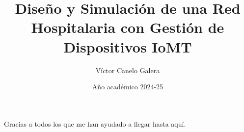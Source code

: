 \documentclass[spanish,GINF]{TFGEPSUIB}
\title{Diseño y Simulación de una Red Hospitalaria con Gestión de Dispositivos IoMT}
\author{Víctor Canelo Galera}
\date{Año académico 2024-25}
\begin{document}
\portada
\portadainterior
\frontmatter

%
\cleartorecto \thispagestyle{empty}
\begin{agraiments}
Gracias a todos los que me han ayudado a llegar hasta aquí.
\end{agraiments}

\cleartorecto \tableofcontents

\cleartorecto \listoffigures
\cleartorecto \listoftables 

 

 

\mainmatter\pagestyle{ruled}














\appendix 
 



\backmatter



 
\end{document}
